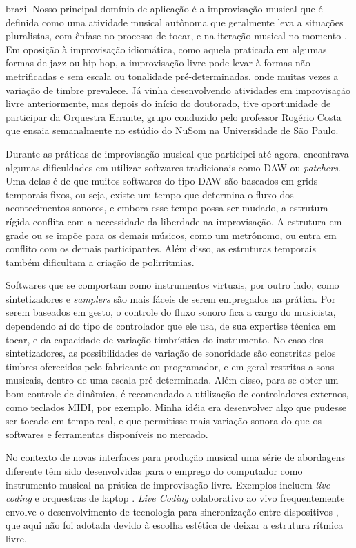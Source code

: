 \begin{otherlanguage*}{brazil}
Nosso principal domínio de aplicação é a improvisação musical que é definida como uma atividade musical autônoma \cite{Canonne2016} que geralmente leva a situações pluralistas, com ênfase no processo de tocar, e na iteração musical no momento \cite{BERGSTROEM-NIELSEN2016}. Em oposição à improvisação idiomática, como aquela praticada em algumas formas de jazz ou hip-hop, a improvisação livre pode levar à formas não metrificadas e sem escala ou tonalidade pré-determinadas, onde muitas vezes a variação de timbre prevalece\cite{Barthet:11a}. Já vinha desenvolvendo atividades em improvisação livre anteriormente, mas depois do início do doutorado, tive oportunidade de participar da Orquestra Errante, grupo conduzido pelo professor Rogério Costa que ensaia semanalmente no estúdio do NuSom na Universidade de São Paulo. 

Durante as práticas de improvisação musical que participei até agora, encontrava algumas dificuldades em utilizar softwares tradicionais como DAW ou \emph{patchers}. Uma delas é de que muitos softwares do tipo DAW são baseados em grids temporais fixos, ou seja, existe um tempo que determina o fluxo dos acontecimentos sonoros, e embora esse tempo possa ser mudado, a estrutura rígida conflita com a necessidade da liberdade na improvisação. A estrutura em grade ou se impõe para os demais músicos, como um metrônomo, ou entra em conflito com os demais participantes. Além disso, as estruturas temporais também dificultam a criação de polirritmias. 

Softwares que se comportam como instrumentos virtuais, por outro lado, como sintetizadores e \emph{samplers} são mais fáceis de serem empregados na prática. Por serem baseados em gesto, o controle do fluxo sonoro fica a cargo do musicista, dependendo aí do tipo de controlador que ele usa, de sua expertise técnica em tocar, e da capacidade de variação timbrística do instrumento. No caso dos sintetizadores, as possibilidades de variação de sonoridade são constritas pelos timbres oferecidos pelo fabricante ou programador, e em geral restritas a sons musicais, dentro de uma escala pré-determinada. Além disso, para se obter um bom controle de dinâmica, é recomendado a utilização de controladores externos, como teclados MIDI, por exemplo. Minha idéia era desenvolver algo que pudesse ser tocado em tempo real, e que permitisse mais variação sonora do que os softwares e ferramentas disponíveis no mercado.

No contexto de novas interfaces para produção musical uma série de abordagens diferente têm sido desenvolvidas para o emprego do computador como instrumento musical na prática de improvisação livre. Exemplos incluem \emph{live coding} \cite{freeman2011collaborative} e orquestras de laptop \cite{Albert2012}. \emph{Live Coding} colaborativo ao vivo frequentemente envolve o desenvolvimento de tecnologia para sincronização entre dispositivos \cite{Wilson2014}, que aqui não foi adotada devido à escolha estética de deixar a estrutura rítmica livre.


\end{otherlanguage*}
